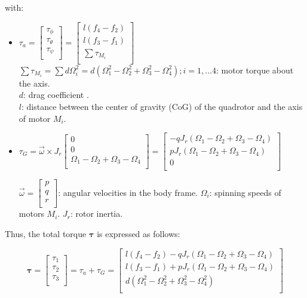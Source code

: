 \documentclass{thesisreport}
\begin{document}
with:

\begin{itemize}
	\item $\tau_a = \begin{bmatrix}
\tau_{\phi}\\
\tau_{\theta}\\
\tau_{\psi}\\
\end{bmatrix}= \begin{bmatrix}
l(f_4 - f_2)\\
l(f_3 - f_1)\\
\sum \tau_{M_i}\\
\end{bmatrix}$\\
$\sum \tau_{M_i} = \sum d \Omega_i^2=d(\Omega_1^2-\Omega_2^2+\Omega_3^2-\Omega_4^2); i=1,\ldots 4$: motor torque about the axis.\\
$d$: drag coefficient .\\
$l$: distance between the center of gravity (CoG) of the quadrotor and the axis of motor $M_i$.

	\item $\tau_G=\overrightarrow{\omega}\times J_r \begin{bmatrix}
0 \\
0 \\
\Omega_1 - \Omega_2 + \Omega_3 - \Omega_4 \\
\end{bmatrix} = \begin{bmatrix}
-q J_r (\Omega_1 - \Omega_2 + \Omega_3 - \Omega_4)\\
p J_r (\Omega_1 - \Omega_2 + \Omega_3 - \Omega_4)\\
0 \\
\end{bmatrix}$

$\overrightarrow{\omega} = \begin{bmatrix}
p \\
q \\
r \\
\end{bmatrix}$: angular velocities in the body frame.
$\Omega_i$: spinning speeds of motors $M_i$.
$J_r$: rotor inertia.
\end{itemize}

Thus, the total torque $\bm{\tau}$ is expressed as follows:

\begin{equation}\label{total_torque_equation}
\bm{\tau} = \begin{bmatrix}
\tau_1\\
\tau_2\\
\tau_3\\
\end{bmatrix} = \tau_a + \tau_G = \begin{bmatrix}
l(f_4-f_2) - qJ_r(\Omega_1-\Omega_2+\Omega_3-\Omega_4)\\
l(f_3-f_1) + pJ_r(\Omega_1-\Omega_2+\Omega_3-\Omega_4)\\
d(\Omega_1^2-\Omega_2^2+\Omega_3^2-\Omega_4^2)\\
\end{bmatrix}
\end{equation}
\end{document}
